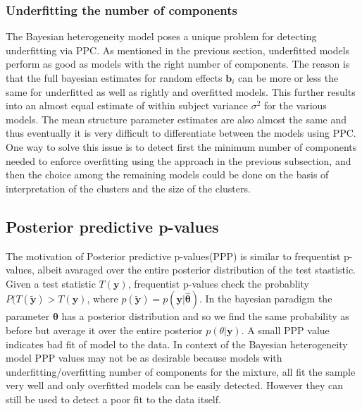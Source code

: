 \subsubsection{Underfitting the number of components}
The Bayesian heterogeneity model poses a unique problem for detecting underfitting via PPC. As mentioned in the previous section, underfitted models perform as good as models with the right number of components. The reason is that the full bayesian estimates for random effects $\boldsymbol{b}_i$ can be more or less the same for underfitted as well as rightly and overfitted models. This further results into an almost equal estimate of within subject variance $\sigma^2$ for the various models. The mean structure parameter estimates are also almost the same and thus eventually it is very difficult to differentiate between the models using PPC. One way to solve this issue is to detect first the minimum number of components needed to enforce overfitting using the approach in the previous subsection, and then the choice among the remaining models could be done on the basis of interpretation of the clusters and the size of the clusters.
 
\subsection{Posterior predictive p-values}
The motivation of Posterior predictive p-values(PPP) is similar to frequentist p-values, albeit avaraged over the entire posterior distribution of the test stastistic. Given a test statistic $T(\boldsymbol{y})$, frequentist p-values check the probablity $P(T(\boldsymbol{\tilde{y}}) > T(\boldsymbol{y})$, where $p(\boldsymbol{\tilde{y}}) = p(\boldsymbol{y}|\boldsymbol{\hat{\theta}})$. In the bayesian paradigm the parameter $\boldsymbol{\theta}$ has a posterior distribution and so we find the same probability as before but average it over the entire posterior $p(\theta|\boldsymbol{y})$. A small PPP value indicates bad fit of model to the data. In context of the Bayesian heterogeneity model PPP values may not be as desirable because models with underfitting/overfitting number of components for the mixture, all fit the sample very well and only overfitted models can be easily detected. However they can still be used to detect a poor fit to the data itself.
